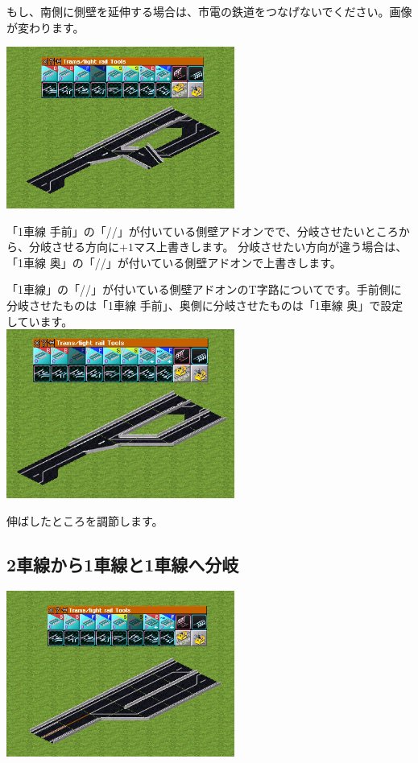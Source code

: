 \documentclass{jbook}
\begin{document}
\begin{multicols}{2}
もし、南側に側壁を延伸する場合は、市電の鉄道をつなげないでください。画像が変わります。

\includegraphics[width = 75mm]{picture/20210214-road-2-6.png}

「1車線 手前」の「//」が付いている側壁アドオンでで、分岐させたいところから、分岐させる方向に$+1$マス上書きします。
分岐させたい方向が違う場合は、「1車線 奥」の「//」が付いている側壁アドオンで上書きします。

「1車線」の「//」が付いている側壁アドオンのT字路についてです。手前側に分岐させたものは「1車線 手前」、奥側に分岐させたものは「1車線 奥」で設定しています。\\



\includegraphics[width = 75mm]{picture/20210214-road-2-8.png}

伸ばしたところを調節します。\\

\end{multicols}


\newpage

\subsection{2車線から1車線と1車線へ分岐}
\label{sub:2lane_to_1lane+1lane}

\includegraphics[width = 75mm]{picture/20210214-road-3-6.png}
\vspace{10pt}
\end{document}

